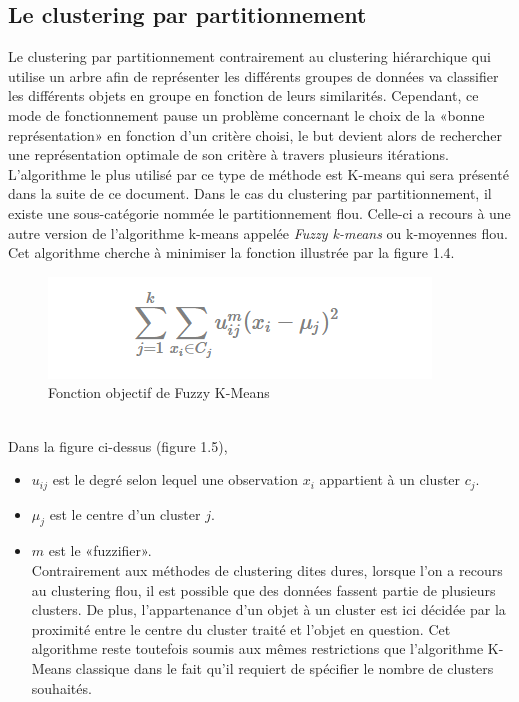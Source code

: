 \documentclass[memoire.tex]{subfiles}
\begin{document}
\newpage
\subsection{Le clustering par partitionnement}
Le clustering par partitionnement contrairement au clustering hiérarchique qui utilise un arbre afin de représenter les différents groupes de données va classifier les différents objets en groupe en fonction de leurs similarités. Cependant, ce mode de fonctionnement pause un problème concernant le choix de la «bonne représentation» en fonction d'un critère choisi, le but devient alors de rechercher une représentation optimale de son critère à travers plusieurs itérations.\cite{ref8} L'algorithme le plus utilisé par ce type de méthode est K-means qui sera présenté dans la suite de ce document. Dans le cas du clustering par partitionnement, il existe une sous-catégorie nommée le partitionnement flou. Celle-ci a recours à une autre version de l'algorithme k-means appelée \textit{Fuzzy k-means} ou k-moyennes flou. Cet algorithme cherche à minimiser la fonction illustrée par la figure 1.4.
	\begin{figure}[h!]
		\centerline{\includegraphics[scale=0.8]{img/fuzzy_algo.png}}
		\caption{Fonction objectif de Fuzzy K-Means}
	\end{figure}\\
Dans la figure ci-dessus (figure 1.5), \begin{itemize}
\item $u_{ij}$ est le degré selon lequel une observation $x_{i}$ appartient à un cluster $c_{j}$.
\item $\mu_j$ est le centre d'un cluster $j$.
\item $m$ est le «fuzzifier».\\
Contrairement aux méthodes de clustering dites dures, lorsque l'on a recours au clustering flou, il est possible que des données fassent partie de plusieurs clusters. De plus, l'appartenance d'un objet à un cluster est ici décidée par la proximité entre le centre du cluster traité et l'objet en question. \cite{ref13} Cet algorithme reste toutefois soumis aux mêmes restrictions que l'algorithme K-Means classique dans le fait qu'il requiert de spécifier le nombre de clusters souhaités.
\end{itemize}
\end{document}
